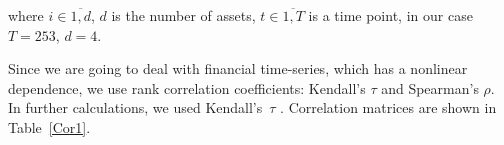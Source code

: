 \documentclass{llncs}
\begin{document}
\noindent where $i \in \overline{1, d}$, $d$ is the number of assets, $t\in \overline{1, T}$ is a time point, in our case $T=253$, $d = 4$. 

Since we are going to deal with financial time-series, which has a nonlinear dependence, 
we use rank correlation coefficients: Kendall's $\tau$ and Spearman's $\rho$. In further calculations, we used Kendall's~$\tau$ \cite{Dissmann2013}.
Correlation matrices are shown in Table~\ref{Cor1}.







\end{document}
